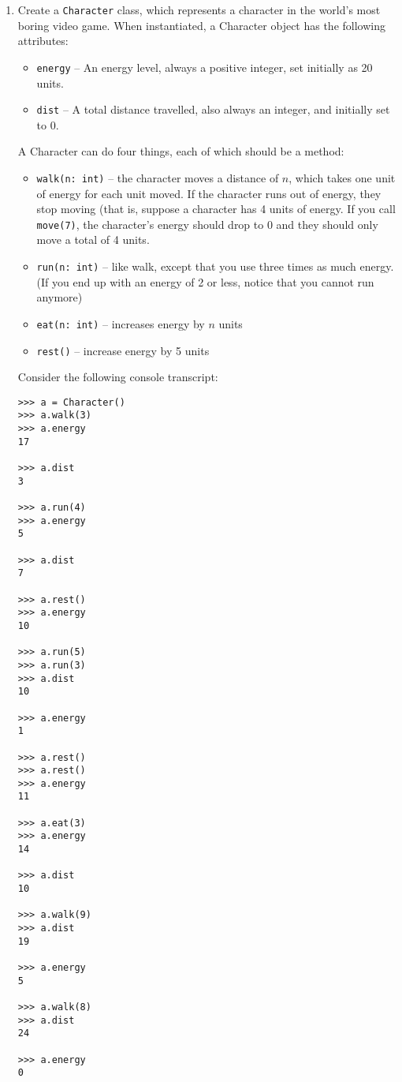 \documentclass{article}
\begin{document}
\begin{enumerate}
\item Create a \verb|Character| class, which represents a character in the world's most boring video game. When instantiated, a Character object has the following attributes:
\begin{itemize}
  \item  \verb|energy| -- An energy level, always a positive integer, set initially as 20 units.
  \item \verb|dist| -- A total distance travelled, also always an integer, and initially set to 0.
\end{itemize}

A Character can do four things, each of which should be a method:
\begin{itemize}
  \item \verb|walk(n: int)| -- the character moves a distance of $n$, which takes one unit of energy for each unit moved. If the character runs out of energy, they stop moving (that is, suppose a character has 4 units of energy. If you call \verb|move(7)|, the character's energy should drop to 0 and they should only move a total of 4 units.
  \item \verb|run(n: int)| -- like walk, except that you use three times as much energy. (If you end up with an energy of 2 or less, notice that you cannot run anymore)
  \item \verb|eat(n: int)| -- increases energy by $n$ units
  \item \verb|rest()| -- increase energy by 5 units
\end{itemize}

Consider the following console transcript:

\begin{verbatim}
>>> a = Character()
>>> a.walk(3)
>>> a.energy
17

>>> a.dist
3

>>> a.run(4)
>>> a.energy
5

>>> a.dist
7

>>> a.rest()
>>> a.energy
10

>>> a.run(5)
>>> a.run(3)
>>> a.dist
10

>>> a.energy
1

>>> a.rest()
>>> a.rest()
>>> a.energy
11

>>> a.eat(3)
>>> a.energy
14

>>> a.dist
10

>>> a.walk(9)
>>> a.dist
19

>>> a.energy
5

>>> a.walk(8)
>>> a.dist
24

>>> a.energy
0
\end{verbatim}




\end{enumerate}
\end{document}
